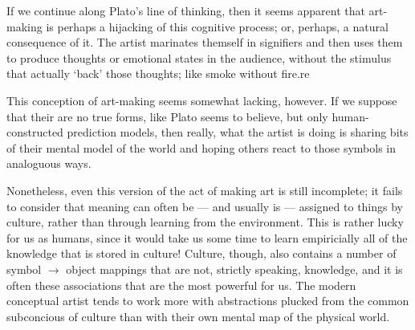 \documentclass[a4paper,12pt]{article}
\begin{document}
If we continue along Plato's line of thinking, then it seems apparent that art-making is perhaps a hijacking of this cognitive process; or, perhaps, a natural consequence of it. The artist marinates themself in signifiers and then uses them to produce thoughts or emotional states in the audience, without the stimulus that actually `back' those thoughts; like smoke without fire.re

This conception of art-making seems somewhat lacking, however. If we suppose that their are no true forms, like Plato seems to believe, but only human-constructed prediction models, then really, what the artist is doing is sharing bits of their mental model of the world and hoping others react to those symbols in analoguous ways.

Nonetheless, even this version of the act of making art is still incomplete; it fails to consider that meaning can often be --- and usually is --- assigned to things by culture, rather than through learning from the environment. This is rather lucky for us as humans, since it would take us some time to learn empiricially all of the knowledge that is stored in culture! Culture, though, also contains a number of symbol $\rightarrow$ object mappings that are not, strictly speaking, knowledge, and it is often these associations that are the most powerful for us. The modern conceptual artist tends to work more with abstractions plucked from the common subconcious of culture than with their own mental map of the physical world.
\end{document}
